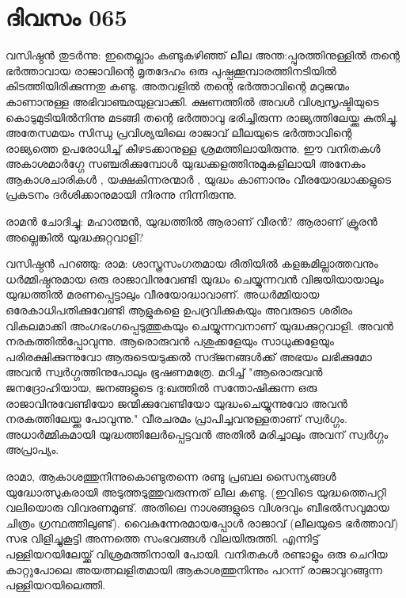  
\section{ദിവസം 065}


വസിഷ്ഠന്‍ തുടര്‍ന്നു: ഇതെല്ലാം കണ്ടുകഴിഞ്ഞ്‌ ലീല അന്ത:പ്പുരത്തിനുള്ളില്‍ തന്റെ ഭര്‍ത്താവായ രാജാവിന്റെ മൃതദേഹം ഒരു പുഷ്പക്കൂമ്പാരത്തിനടിയില്‍ കിടത്തിയിരിക്കുന്നതു കണ്ടു. അതവളില്‍ തന്റെ ഭര്‍ത്താവിന്റെ മറുജന്മം കാണാനുള്ള അഭിവാഞ്ഛയുളവാക്കി. ക്ഷണത്തില്‍ അവള്‍ വിശ്വസൃഷ്ടിയുടെ കൊടുമുടിയില്‍നിന്നു മടങ്ങി തന്റെ ഭര്‍ത്താവു ഭരിച്ചിരുന്ന രാജ്യത്തിലേയ്ക്കു കുതിച്ചു. അതേസമയം സിന്ധു പ്രവിശ്യയിലെ രാജാവ്‌ ലീലയുടെ ഭര്‍ത്താവിന്റെ രാജ്യത്തെ ഉപരോധിച്ച്‌ കീഴടക്കാനുള്ള ശ്രമത്തിലായിരുന്നു. ഈ വനിതകള്‍ അകാശമാര്‍ഗ്ഗേ സഞ്ചരിക്കുമ്പോള്‍ യുദ്ധക്കളത്തിനുമുകളിലായി അനേകം ആകാശചാരികള്‍ , യക്ഷകിന്നരന്മാര്‍ , യുദ്ധം കാണാനും വീരയോദ്ധാക്കളുടെ പ്രകടനം ദര്‍ശിക്കാനുമായി നിരന്നു നിന്നിരുന്നു.

രാമന്‍ ചോദിച്ചു: മഹാത്മന്‍, യുദ്ധത്തില്‍ ആരാണ്‌ വീരന്‍? ആരാണ്‌ ക്രൂരന്‍ അല്ലെങ്കില്‍ യുദ്ധക്കുറ്റവാളി?

വസിഷ്ഠന്‍ പറഞ്ഞു: രാമ: ശാസ്ത്രസംഗതമായ രീതിയില്‍ കളങ്കമില്ലാത്തവനും ധര്‍മ്മിഷ്ഠനുമായ ഒരു രാജാവിനുവേണ്ടി യുദ്ധം ചെയ്യുന്നവന്‍ വിജയിയായാലും യുദ്ധത്തില്‍ മരണപ്പെട്ടാലും വീരയോദ്ധാവാണ്‌. അധര്‍മ്മിയായ ഒരേകാധിപതിക്കുവേണ്ടി ആളുകളെ ഉപദ്രവിക്കുകയും അവരുടെ ശരീരം വികലമാക്കി അംഗഭംഗപ്പെടുത്തുകയും ചെയ്യുന്നവനാണ്‌ യുദ്ധക്കുറ്റവാളി. അവന്‍ നരകത്തില്‍പ്പോവുന്നു. ആരൊരുവന്‍ പശുക്കളേയും സാധുക്കളേയും പരിരക്ഷിക്കുന്നുവോ ആരുടെയടുക്കല്‍ സദ്ജനങ്ങള്‍ക്ക്‌ അഭയം ലഭിക്കുമോ അവന്‍ സ്വര്‍ഗ്ഗത്തിനുപോലും ഭൂഷണമത്രേ. മറിച്ച്‌ "ആരൊരുവന്‍ ജനദ്രോഹിയായ, ജനങ്ങളുടെ ദു:ഖത്തില്‍ സന്തോഷിക്കുന്ന ഒരു രാജാവിനുവേണ്ടിയോ ജന്മിക്കുവേണ്ടിയോ യുദ്ധംചെയ്യുന്നുവോ അവന്‍ നരകത്തിലേയ്ക്കു പോവുന്നു." വീരചരമം പ്രാപിച്ചവനുള്ളതാണ്‌ സ്വര്‍ഗ്ഗം. അധാര്‍മ്മികമായി യുദ്ധത്തിലേര്‍പ്പെട്ടവന്‍ അതില്‍ മരിച്ചാലും അവന്‌ സ്വര്‍ഗ്ഗം അപ്രാപ്യം.

രാമാ, ആകാശത്തുനിന്നുകൊണ്ടുതന്നെ രണ്ടു പ്രബല സൈന്യങ്ങള്‍ യുദ്ധോത്സുകരായി അടുത്തടുത്തുവരുന്നത്‌ ലീല കണ്ടു. (ഇവിടെ യുദ്ധത്തെപറ്റി വലിയൊരു വിവരണമുണ്ട്‌. അതിലെ നാശങ്ങളുടെ വിശദവും ബീഭല്‍സവുമായ ചിത്രം ഗ്രന്ഥത്തിലുണ്ട്‌). വൈകുന്നേരമായപ്പോള്‍  രാജാവ്‌ (ലീലയുടെ ഭർത്താവ്) സഭ വിളിച്ചുകൂട്ടി അന്നത്തെ സംഭവങ്ങള്‍ വിലയിരുത്തി. എന്നിട്ട്‌ പള്ളിയറയിലേയ്ക്ക്‌ വിശ്രമത്തിനായി പോയി. വനിതകള്‍ രണ്ടാളും ഒരു ചെറിയ കാറ്റുപോലെ അയത്നലളിതമായി ആകാശത്തുനിന്നും പറന്ന് രാജാവുറങ്ങുന്ന പള്ളിയറയിലെത്തി.
